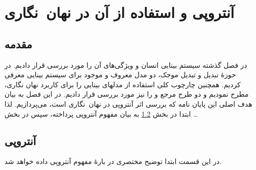 \chapter{آنتروپی و استفاده از آن در نهان~نگاری}\label{ch:Entropy}
 
\section{مقدمه}

در فصل گذشته سیستم بینایی انسان و ویژگی‌های آن را مورد بررسی قرار دادیم.
در حوزهٔ تبدیل  و تبدیل موجک، دو مدل معروف و موجود برای سیستم بینایی
معرفی کردیم. همچنین  چارچوب کلی استفاده از مدلهای بینایی را برای  کاربرد
نهان نگاری، مطرح نمودیم و دو طرح مرجع  و  را نیز مورد بررسی قرار دادیم. 
در این فصل به بیان هدف اصلی این پایان نامه که بررسی اثر آنتروپی در نهان~نگاری است، می‌پردازیم.
لذا ابتدا در بخش \ref{sec:entropy} به  بیان مفهوم آنتروپی پرداخته، سپس در 
بخش \dots 

\section{آنتروپی}\label{sec:entropy}

در این قسمت ابتدا توضیح مختصری در بارهٔ مفهوم آنتروپی داده خواهد شد. 

